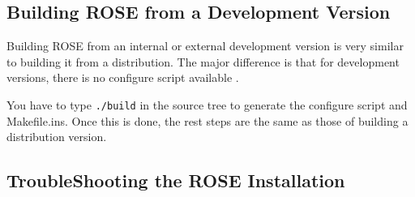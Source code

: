 \subsection{Building ROSE from a Development Version}
\label{gettingStarted:UserInstructionsForDevelopmentVersion}
Building ROSE from an internal or external development version is very
similar to building it from a distribution. The major difference is that
for development versions, there is no configure script available . 

You have to type {\tt ./build} in the source tree to 
generate the configure script and Makefile.ins. Once this is done, the rest
steps are the same as those of building a distribution version.

\subsection{TroubleShooting the ROSE Installation}


